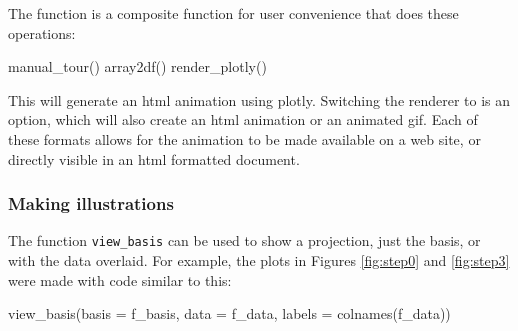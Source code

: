 \begin{Schunk}
\end{Schunk}

The  function is a composite function for
user convenience that does these operations:

\begin{Schunk}
\begin{Sinput}
manual_tour()
array2df()
render_plotly()
\end{Sinput}
\end{Schunk}

\noindent This will generate an html animation using plotly. Switching
the renderer to  is an option, which will also create an
html animation or an animated gif. Each of these formats allows for the
animation to be made available on a web site, or directly visible in an
html formatted document.

\hypertarget{making-illustrations}{%
\subsubsection{Making illustrations}\label{making-illustrations}}

The function \texttt{view\_basis} can be used to show a projection, just
the basis, or with the data overlaid. For example, the plots in Figures
\ref{fig:step0} and \ref{fig:step3} were made with code similar to this:

\begin{Schunk}
\begin{Sinput}
view_basis(basis = f_basis, 
           data = f_data,
           labels = colnames(f_data))
\end{Sinput}
\end{Schunk}

